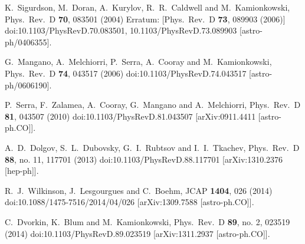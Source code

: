 \documentclass[aps,prd,a4paper,twocolumn,amsmath,showpacs,superscriptaddress,nofootinbib,preprintnumbers]{revtex4-1}
\begin{document}
\begin{thebibliography}{99}
  
  
  K.~Sigurdson, M.~Doran, A.~Kurylov, R.~R.~Caldwell and M.~Kamionkowski,
  Phys.\ Rev.\ D {\bf 70}, 083501 (2004)
  Erratum: [Phys.\ Rev.\ D {\bf 73}, 089903 (2006)]
  doi:10.1103/PhysRevD.70.083501, 10.1103/PhysRevD.73.089903
  [astro-ph/0406355].
  
  G.~Mangano, A.~Melchiorri, P.~Serra, A.~Cooray and M.~Kamionkowski,
  Phys.\ Rev.\ D {\bf 74}, 043517 (2006)
  doi:10.1103/PhysRevD.74.043517
  [astro-ph/0606190].
  
  P.~Serra, F.~Zalamea, A.~Cooray, G.~Mangano and A.~Melchiorri,
  Phys.\ Rev.\ D {\bf 81}, 043507 (2010)
  doi:10.1103/PhysRevD.81.043507
  [arXiv:0911.4411 [astro-ph.CO]].
  
  
  A.~D.~Dolgov, S.~L.~Dubovsky, G.~I.~Rubtsov and I.~I.~Tkachev,
  Phys.\ Rev.\ D {\bf 88}, no. 11, 117701 (2013)
  doi:10.1103/PhysRevD.88.117701
  [arXiv:1310.2376 [hep-ph]].
  
  
  R.~J.~Wilkinson, J.~Lesgourgues and C.~Boehm,
  JCAP {\bf 1404}, 026 (2014)
  doi:10.1088/1475-7516/2014/04/026
  [arXiv:1309.7588 [astro-ph.CO]].
  
 

  C.~Dvorkin, K.~Blum and M.~Kamionkowski,
  Phys.\ Rev.\ D {\bf 89}, no. 2, 023519 (2014)
  doi:10.1103/PhysRevD.89.023519
  [arXiv:1311.2937 [astro-ph.CO]].
  

\end{thebibliography}
\end{document}

